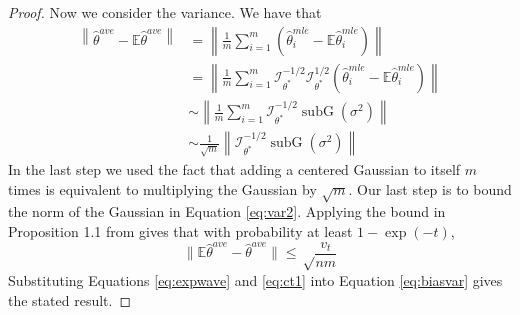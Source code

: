 \documentclass[twoside]{article}
\DeclareMathOperator*{\subG}{subG}
\DeclareMathOperator*{\tr}{tr}
\newcommand{\zero}{\text{\textbf{0}}}
\newcommand{\E}{\mathbb{E}}
\newcommand{\w}{\theta}
\newcommand{\wave}{\hat\w^{ave}}
\newcommand{\wtave}{\E\hat\w^{ave}}
\newcommand{\wmle}{\hat\w^{mle}}
\newcommand{\wstar}{{\w^{*}}}
\newcommand{\I}{\mathcal I}
\newcommand{\normal}[2]{\ensuremath{\mathcal{N}\left({{#1}},{{#2}}\right)}}
\newcommand{\subnormal}[1]{\ensuremath{\subG\left({{#1}}\right)}}
\newcommand{\ltwo}[1]{{\lVert {#1} \rVert}}
\newcommand{\ltwobig}[1]{{\left\lVert {#1} \right\rVert}}
\begin{document}
\begin{proof}
Now we consider the variance.
We have that
\begin{align}
\ltwobig{\wave-\E\wave}
&=
\ltwobig{\frac{1}{m}\sum_{i=1}^m\left(\wmle_i-\E\wmle_i\right)}
\\&=
\ltwobig{\frac{1}{m}\sum_{i=1}^m\I^{-1/2}_\wstar\I^{1/2}_\wstar\left(\wmle_i-\E\wmle_i\right)}
\\&\sim
\ltwobig{\frac{1}{m}\sum_{i=1}^m\I^{-1/2}_\wstar\subnormal{\sigma^2}}
\\&\sim
\frac{1}{\sqrt m}\ltwobig{\I^{-1/2}_\wstar\subnormal{\sigma^2}}
\label{eq:var2}
\end{align}
In the last step we used the fact that adding a centered Gaussian to itself $m$ times is equivalent to multiplying the Gaussian by $\sqrt{m}$.
Our last step is to bound the norm of the Gaussian in Equation \ref{eq:var2}.
Applying the bound in Proposition 1.1 from \cite{hsu2012tail} gives that with probability at least $1-\exp(-t)$,
\begin{equation}
\ltwo{\E\wave-\wave} \le \sqrt\frac{v_t}{nm}
\label{eq:ct1}
\end{equation}
Substituting Equations \ref{eq:expwave} and \ref{eq:ct1} into Equation \ref{eq:biasvar} gives the stated result.
\end{proof}
\end{document}
